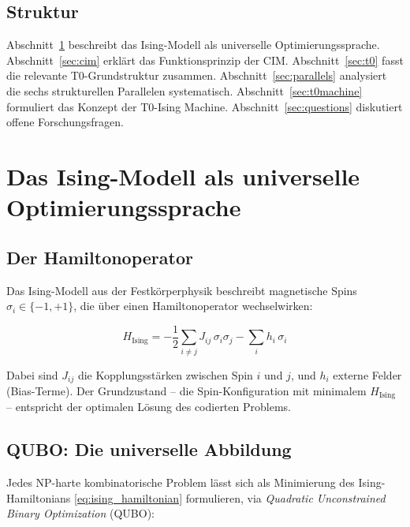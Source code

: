 \subsection{Struktur}

Abschnitt~\ref{sec:ising} beschreibt das Ising-Modell als universelle 
Optimierungssprache. Abschnitt~\ref{sec:cim} erklärt das Funktionsprinzip der CIM.
Abschnitt~\ref{sec:t0} fasst die relevante T0-Grundstruktur zusammen.
Abschnitt~\ref{sec:parallels} analysiert die sechs strukturellen Parallelen systematisch.
Abschnitt~\ref{sec:t0machine} formuliert das Konzept der T0-Ising Machine.
Abschnitt~\ref{sec:questions} diskutiert offene Forschungsfragen.

\clearpage

\section{Das Ising-Modell als universelle Optimierungssprache}
\label{sec:ising}

\subsection{Der Hamiltonoperator}

Das Ising-Modell aus der Festkörperphysik beschreibt magnetische Spins 
$\sigma_i \in \{-1, +1\}$, die über einen Hamiltonoperator wechselwirken:

\begin{equation}
    H_{\text{Ising}} = -\frac{1}{2} \sum_{i \neq j} J_{ij} \, \sigma_i \sigma_j 
    - \sum_{i} h_i \, \sigma_i
    \label{eq:ising_hamiltonian}
\end{equation}

Dabei sind $J_{ij}$ die Kopplungsstärken zwischen Spin $i$ und $j$, und $h_i$ 
externe Felder (Bias-Terme). Der Grundzustand -- die Spin-Konfiguration mit minimalem 
$H_{\text{Ising}}$ -- entspricht der optimalen Lösung des codierten Problems.

\subsection{QUBO: Die universelle Abbildung}

Jedes NP-harte kombinatorische Problem lässt sich als Minimierung des Ising-Hamiltonians 
\eqref{eq:ising_hamiltonian} formulieren, via \emph{Quadratic Unconstrained Binary 
Optimization} (QUBO):

